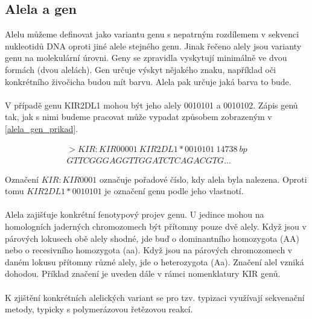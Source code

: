 \documentclass[czech,DP]{thesiskiv}
\numberwithin{equation}{section}
\begin{document}
\subsection{Alela a gen}
Alelu můžeme definovat jako variantu genu s nepatrným rozdílemem v sekvenci nukleotidů DNA oproti jiné alele stejného genu. Jinak řečeno alely jsou varianty genu na molekulární úrovni. Geny se zpravidla vyskytují minimálně ve dvou formách (dvou alelách). Gen určuje výskyt nějakého znaku, například oči konkrétního živočicha budou mít barvu. Alela pak určuje jaká barva to bude.
\\
\\
V případě genu KIR2DL1 mohou být jeho alely 0010101 a 0010102. Zápis genů tak, jak s nimi budeme pracovat může vypadat způsobem zobrazeným v \ref{alela_gen_prikad}. 

\begin{equation}\begin{split} 
   \label{alela_gen_prikad}
   		>KIR:KIR00001\: KIR2DL1*0010101\: 14738\: bp \\
		GTTCGGGAGGTTGGATCTCAGACGTG...
\end{split}\end{equation}

\noindent 
Označení $KIR:KIR0001$ označuje pořadové číslo, kdy alela byla nalezena. Oproti tomu $KIR2DL1*0010101$ je označení genu podle jeho vlastnotí.
\\
\\
Alela zajišťuje konkrétní fenotypový projev genu. U jedince mohou na homologních jaderných chromozomech být přítomny pouze dvě alely. Když jsou v párových lokusech obě alely shodné, jde buď o dominantního homozygota (AA) nebo o recesivního homozygota (aa). Když jsou na párových chromozomech v daném lokusu přítomny různé alely, jde o heterozygota (Aa). Značení alel vzniká dohodou. Příklad značení je uveden dále v rámci nomenklatury KIR genů.
\\
\\
K zjištění konkrétních alelických variant se pro tzv. typizaci využívají sekvenační metody, typicky s polymerázovou řetězovou reakcí. 
\end{document}
